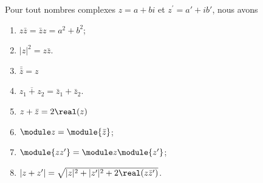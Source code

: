 \begin{proposition}     \label{PROPooUMVGooIrhZZg}
	Pour tout nombres complexes \( z = a+bi\) et \( z^\prime=a'+ib'\), nous avons
	\begin{enumerate}
		\item       \label{ITEMooYBJVooGXiDSd}
		      \( z \bar z =\bar z z = a^2 + b^2\);
		\item	\label{ITEMooKIDXooYANMUz}
		      \( | z |^2=z\bar z\).
		\item       \label{ITEMooCGLSooKHbzkn}
		      \( \bar{\bar{z}} = z\)
		\item		\label{ITEMooYXVXooObkeTM}
		      \( \overline{z_1+z_2}=\bar z_1+\bar z_2\).
		\item		\label{ITEMooGVWGooPQBUHC}
		      \( z+\bar z=2\real(z)\)
		\item       \label{ITEMooDKWDooUjEuZA}
		      \( \module z = \module {\bar z}\);
		\item       \label{ITEMooFXKYooUOXbwH}
		      \( \module{zz^\prime} = \module z \module{z^\prime}\);
		\item     \label{ITEMooUJHPooUFdvqB}
		      \( | z+z' |=\sqrt{ | z |^2+| z' |^2+2\real(z\bar z') }\).
	\end{enumerate}
\end{proposition}


